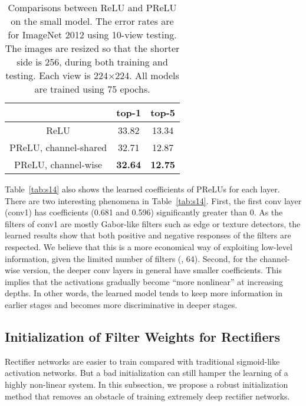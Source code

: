 \documentclass[10pt,twocolumn,letterpaper]{article}
\begin{document}
\setlength{\tabcolsep}{6pt}
\begin{table}[t]
\begin{center}
\small
\begin{tabular}{c|cc}
\hline
   & top-1 & top-5 \\
\hline
\hline
ReLU & 33.82 & 13.34\\
\hline
PReLU, channel-shared & 32.71 & 12.87\\
PReLU, channel-wise   & \textbf{32.64} & \textbf{12.75}\\
\hline
\end{tabular}
\end{center}
\caption{Comparisons between ReLU and PReLU on the small model. The error rates are for ImageNet 2012 using 10-view testing. The images are resized so that the shorter side is 256, during both training and testing. Each view is 224$\times$224. All models are trained using 75 epochs.}
\label{tab:s14_ablated}
\end{table}

Table~\ref{tab:s14} also shows the learned coefficients of PReLUs for each layer.
There are two interesting phenomena in Table~\ref{tab:s14}. First, the first conv layer (conv1) has coefficients (0.681 and 0.596) significantly greater than 0. As the filters of conv1 are mostly Gabor-like filters such as edge or texture detectors, the learned results show that both positive and negative responses of the filters are respected. We believe that this is a more economical way of exploiting low-level information, given the limited number of filters (\eg, 64). Second, for the channel-wise version, the deeper conv layers in general have smaller coefficients. This implies that the activations gradually become ``more nonlinear'' at increasing depths. In other words, the learned model tends to keep more information in earlier stages and becomes more discriminative in deeper stages.

\subsection{Initialization of Filter Weights for Rectifiers}
\label{sec:init}

Rectifier networks are easier to train \cite{Glorot2011,Krizhevsky2012,Zeiler2013} compared with traditional sigmoid-like activation networks. But a bad initialization can still hamper the learning of a highly non-linear system. In this subsection, we propose a robust initialization method that removes an obstacle of training extremely deep rectifier networks.
\end{document}
